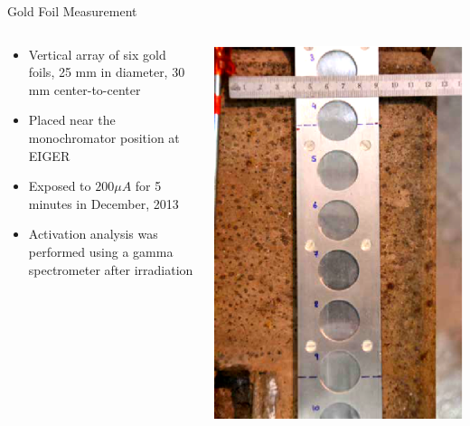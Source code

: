 \documentclass[final,t]{beamer}
\begin{document}
\begin{frame}{}
\begin{columns}[t]
    \begin{column}{.3\linewidth}

    \begin{block}{Gold Foil Measurement}
        \begin{columns}[T]
          \begin{column}{.65\linewidth}
          \begin{itemize} 
          \item Vertical array of six gold foils, 25 mm in diameter, 30 mm center-to-center
          \item Placed near the monochromator position at EIGER
          \item Exposed to $200 \mu A$ for 5 minutes in December, 2013
          \item Activation analysis was performed using a gamma spectrometer after irradiation
          \end{itemize}

            
          \end{column}
          \begin{column}{.35\linewidth}
            \includegraphics*[angle=90,width=\linewidth]{foils.eps}
          \end{column}
        \end{columns}
      \end{block}


\end{column}
\end{columns}
\end{frame}
\end{document}
